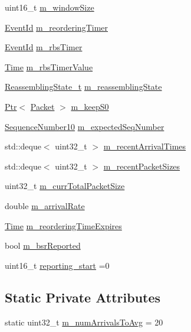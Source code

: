 \begin{DoxyCompactItemize}
uint16\+\_\+t \hyperlink{classns3_1_1LteRlcUmLowLat_aecfdc0c06f03a1aa8958f06e077fd2fd}{m\+\_\+window\+Size}
\item 
\hyperlink{classns3_1_1EventId}{Event\+Id} \hyperlink{classns3_1_1LteRlcUmLowLat_acdfbcc86e123c216e53493045d7c7afd}{m\+\_\+reordering\+Timer}
\item 
\hyperlink{classns3_1_1EventId}{Event\+Id} \hyperlink{classns3_1_1LteRlcUmLowLat_af12e88903d1be103b24523df641f63aa}{m\+\_\+rbs\+Timer}
\item 
\hyperlink{classns3_1_1Time}{Time} \hyperlink{classns3_1_1LteRlcUmLowLat_a5b3398ca6129f4450494f56a080b73ed}{m\+\_\+rbs\+Timer\+Value}
\item 
\hyperlink{classns3_1_1LteRlcUmLowLat_a0681446b7b6191c38dbf0fc526a917bf}{Reassembling\+State\+\_\+t} \hyperlink{classns3_1_1LteRlcUmLowLat_a5e5269ecafdea7712cd6f6a3a2535e32}{m\+\_\+reassembling\+State}
\item 
\hyperlink{classns3_1_1Ptr}{Ptr}$<$ \hyperlink{classns3_1_1Packet}{Packet} $>$ \hyperlink{classns3_1_1LteRlcUmLowLat_ab8753280149fbfbf919ab899a193df73}{m\+\_\+keep\+S0}
\item 
\hyperlink{classns3_1_1SequenceNumber10}{Sequence\+Number10} \hyperlink{classns3_1_1LteRlcUmLowLat_aa1523ceabc0b0aaf4865b2e30e4ce47c}{m\+\_\+expected\+Seq\+Number}
\item 
std\+::deque$<$ uint32\+\_\+t $>$ \hyperlink{classns3_1_1LteRlcUmLowLat_ab8fa4c3a0b133d8ae7388a14a1d4ee82}{m\+\_\+recent\+Arrival\+Times}
\item 
std\+::deque$<$ uint32\+\_\+t $>$ \hyperlink{classns3_1_1LteRlcUmLowLat_a2be774f5d157ca71915751caeb5bce5d}{m\+\_\+recent\+Packet\+Sizes}
\item 
uint32\+\_\+t \hyperlink{classns3_1_1LteRlcUmLowLat_abd74105814ec8f1bf12d9603484c0618}{m\+\_\+curr\+Total\+Packet\+Size}
\item 
double \hyperlink{classns3_1_1LteRlcUmLowLat_af21ae9a7045300d4a4c48da973e5f697}{m\+\_\+arrival\+Rate}
\item 
\hyperlink{classns3_1_1Time}{Time} \hyperlink{classns3_1_1LteRlcUmLowLat_a2850fb104c08957ef58e3c2fc7743aa7}{m\+\_\+reordering\+Time\+Expires}
\item 
bool \hyperlink{classns3_1_1LteRlcUmLowLat_a4c9b565124e3f589008eaece72f46e3e}{m\+\_\+bsr\+Reported}
\item 
uint16\+\_\+t \hyperlink{classns3_1_1LteRlcUmLowLat_ad6a6d38a3e9ffbbd185cc16ca102a621}{reporting\+\_\+start} =0
\end{DoxyCompactItemize}
\subsection*{Static Private Attributes}
\begin{DoxyCompactItemize}
\item 
static uint32\+\_\+t \hyperlink{classns3_1_1LteRlcUmLowLat_a057422a7c000ac0a0476a03bba322a07}{m\+\_\+num\+Arrivals\+To\+Avg} = 20
\end{DoxyCompactItemize}
